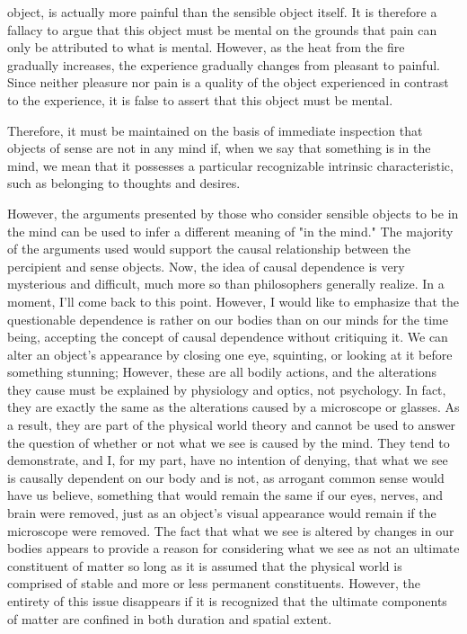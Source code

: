 \documentclass[a4paper,12pt]{book}[2004/02/16]
\theoremstyle{ilemma}
\theoremstyle{itheorem}
\theoremstyle{iother}
\theoremstyle{icorollary}
\theoremstyle{numcorollary}
\theoremstyle{idefinition}
\begin{document}
object, is actually more painful than the sensible object itself. It is therefore a fallacy to argue that this object must be mental on the grounds that pain can only be attributed to what is mental. However, as the heat from the fire gradually increases, the experience gradually changes from pleasant to painful. Since neither pleasure nor pain is a quality of the object experienced in contrast to the experience, it is false to assert that this object must be mental.

Therefore, it must be maintained on the basis of immediate inspection that objects of sense are not in any mind if, when we say that something is in the mind, we mean that it possesses a particular recognizable intrinsic characteristic, such as belonging to thoughts and desires.

However, the arguments presented by those who consider sensible objects to be in the mind can be used to infer a different meaning of "in the mind." The majority of the arguments used would support the causal relationship between the percipient and sense objects. Now, the idea of causal dependence is very mysterious and difficult, much more so than philosophers generally realize. In a moment, I'll come back to this point. However, I would like to emphasize that the questionable dependence is rather on our bodies than on our minds for the time being, accepting the concept of causal dependence without critiquing it. We can alter an object's appearance by closing one eye, squinting, or looking at it before something stunning; However, these are all bodily actions, and the alterations they cause must be explained by physiology and optics, not psychology. In fact, they are exactly the same as the alterations caused by a microscope or glasses. As a result, they are part of the physical world theory and cannot be used to answer the question of whether or not what we see is caused by the mind. They tend to demonstrate, and I, for my part, have no intention of denying, that what we see is causally dependent on our body and is not, as arrogant common sense would have us believe, something that would remain the same if our eyes, nerves, and brain were removed, just as an object's visual appearance would remain if the microscope were removed. The fact that what we see is altered by changes in our bodies appears to provide a reason for considering what we see as not an ultimate constituent of matter so long as it is assumed that the physical world is comprised of stable and more or less permanent constituents. However, the entirety of this issue disappears if it is recognized that the ultimate components of matter are confined in both duration and spatial extent.
\end{document}
